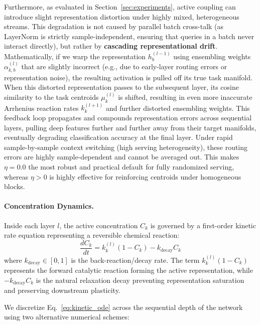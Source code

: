 Furthermore, as evaluated in Section~\ref{sec:experiments}, active coupling can introduce slight representation distortion under highly mixed, heterogeneous streams. This degradation is not caused by parallel batch cross-talk (as LayerNorm is strictly sample-independent, ensuring that queries in a batch never interact directly), but rather by \textbf{cascading representational drift}. Mathematically, if we warp the representation $h_b^{(l-1)}$ using ensembling weights $\alpha_{k, b}^{(l)}$ that are slightly incorrect (e.g., due to early-layer routing errors or representation noise), the resulting activation is pulled off its true task manifold. When this distorted representation passes to the subsequent layer, its cosine similarity to the task centroids $\mu_k^{(l)}$ is shifted, resulting in even more inaccurate Arrhenius reaction rates $k_{k}^{(l+1)}$ and further distorted ensembling weights. This feedback loop propagates and compounds representation errors across sequential layers, pulling deep features further and further away from their target manifolds, eventually degrading classification accuracy at the final layer. Under rapid sample-by-sample context switching (high serving heterogeneity), these routing errors are highly sample-dependent and cannot be averaged out. This makes $\eta = 0.0$ the most robust and practical default for fully randomized serving, whereas $\eta > 0$ is highly effective for reinforcing centroids under homogeneous blocks.

\paragraph{Concentration Dynamics.} Inside each layer $l$, the active concentration $C_{k}$ is governed by a first-order kinetic rate equation representing a reversible chemical reaction:
\begin{equation}
\frac{d C_{k}}{d t} = k_{k}^{(l)} (1 - C_{k}) - k_{\text{decay}} C_{k}
\label{eq:kinetic_ode}
\end{equation}
where $k_{\text{decay}} \in [0, 1]$ is the back-reaction/decay rate. The term $k_{k}^{(l)} (1 - C_{k})$ represents the forward catalytic reaction forming the active representation, while $-k_{\text{decay}} C_{k}$ is the natural relaxation decay preventing representation saturation and preserving downstream plasticity.

We discretize Eq.~\ref{eq:kinetic_ode} across the sequential depth of the network using two alternative numerical schemes:


